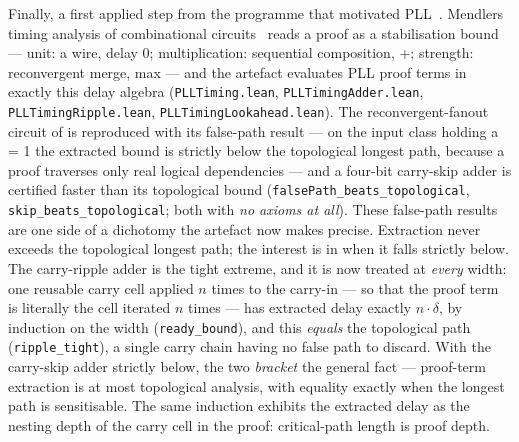 Finally, a first applied step from the programme that motivated
PLL~\cite{FairtloughMendler1994}.
Mendler\textquotesingle s timing analysis of
combinational circuits~\cite{Mendler2000} reads a proof as a
stabilisation bound --- unit: a wire, delay 0; multiplication:
sequential composition, +; strength: reconvergent merge, max --- and
the artefact evaluates PLL proof terms in exactly this delay algebra
(\texttt{PLLTiming.lean}, \texttt{PLLTimingAdder.lean},
\texttt{PLLTimingRipple.lean}, \texttt{PLLTimingLookahead.lean}). The
reconvergent-fanout circuit of \cite[\S7]{Mendler2000} is reproduced
with its false-path result --- on the input class holding a = 1 the
extracted bound is strictly below the topological longest path,
because a proof traverses only real logical dependencies --- and a
four-bit carry-skip adder is certified faster than its topological
bound (\texttt{falsePath\_beats\_topological},
\texttt{skip\_beats\_topological}; both with \emph{no
axioms at all}). These false-path results are one side of a dichotomy the artefact now
makes precise. Extraction never exceeds the topological longest path;
the interest is in when it falls strictly below. The carry-ripple
adder is the tight extreme, and it is now treated at \emph{every}
width: one reusable carry cell applied \ensuremath{n} times to the
carry-in --- so that the proof term is literally the cell iterated
\ensuremath{n} times --- has extracted delay exactly
\ensuremath{n\cdot\delta}, by induction on the width
(\texttt{ready\_bound}), and this \emph{equals} the topological path
(\texttt{ripple\_tight}), a single carry chain having no false path to
discard. With the carry-skip adder strictly below, the two
\emph{bracket} the general fact --- proof-term extraction is at most
topological analysis, with equality exactly when the longest path is
sensitisable. The same induction exhibits the extracted delay as the
nesting depth of the carry cell in the proof: critical-path length is
proof depth.

